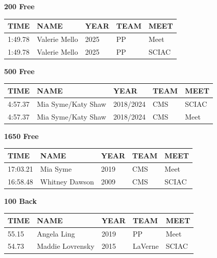 \begin{table}[H]
\centering
\begin{minipage}[t]{0.48\textwidth}
\centering
\textbf{200 Free}\\[0.1cm]
\begin{tabular}{@{}p{1.8cm}p{2.8cm}p{1.2cm}p{1.4cm}p{1.4cm}@{}}
\hline
    \textbf{TIME} & \textbf{NAME} & \textbf{YEAR} & \textbf{TEAM} & \textbf{MEET} \\
\hline
    1:49.78 & Valerie Mello & 2025 & PP & Meet \\
    1:49.78 & Valerie Mello & 2025 & PP & SCIAC \\
\hline
\end{tabular}
\end{minipage}\hfill
\begin{minipage}[t]{0.48\textwidth}
\centering
\textbf{500 Free}\\[0.1cm]
\begin{tabular}{@{}p{1.8cm}p{2.8cm}p{1.2cm}p{1.4cm}p{1.4cm}@{}}
\hline
    \textbf{TIME} & \textbf{NAME} & \textbf{YEAR} & \textbf{TEAM} & \textbf{MEET} \\
\hline
    4:57.37 & Mia Syme/Katy Shaw & 2018/2024 & CMS & SCIAC \\
    4:57.37 & Mia Syme/Katy Shaw & 2018/2024 & CMS & Meet \\
\hline
\end{tabular}
\end{minipage}
\end{table}

\begin{table}[H]
\centering
\begin{minipage}[t]{0.48\textwidth}
\centering
\textbf{1650 Free}\\[0.1cm]
\begin{tabular}{@{}p{1.8cm}p{2.8cm}p{1.2cm}p{1.4cm}p{1.4cm}@{}}
\hline
    \textbf{TIME} & \textbf{NAME} & \textbf{YEAR} & \textbf{TEAM} & \textbf{MEET} \\
\hline
    17:03.21 & Mia Syme & 2019 & CMS & Meet \\
    16:58.48 & Whitney Dawson & 2009 & CMS & SCIAC \\
\hline
\end{tabular}
\end{minipage}\hfill
\begin{minipage}[t]{0.48\textwidth}
\centering
\textbf{100 Back}\\[0.1cm]
\begin{tabular}{@{}p{1.8cm}p{2.8cm}p{1.2cm}p{1.4cm}p{1.4cm}@{}}
\hline
    \textbf{TIME} & \textbf{NAME} & \textbf{YEAR} & \textbf{TEAM} & \textbf{MEET} \\
\hline
    55.15 & Angela Ling & 2019 & PP & Meet \\
    54.73 & Maddie Lovrensky & 2015 & LaVerne & SCIAC \\
\hline
\end{tabular}
\end{minipage}
\end{table}

